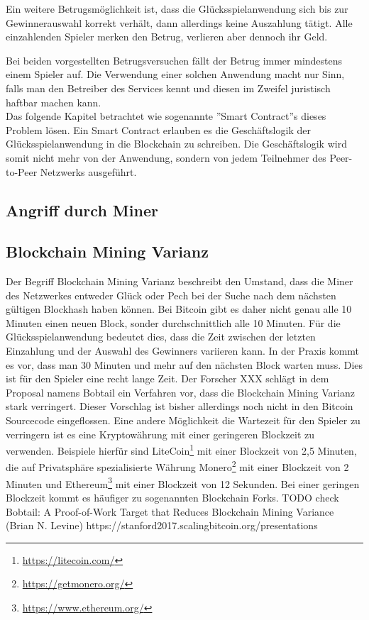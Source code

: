 Ein weitere Betrugsmöglichkeit ist, dass die Glücksspielanwendung sich bis zur Gewinnerauswahl korrekt verhält, dann allerdings keine Auszahlung tätigt. Alle einzahlenden Spieler merken den Betrug, verlieren aber dennoch ihr Geld.

Bei beiden vorgestellten Betrugsversuchen fällt der Betrug immer mindestens einem Spieler auf. Die Verwendung einer solchen Anwendung macht nur Sinn, falls man den Betreiber des Services kennt und diesen im Zweifel juristisch haftbar machen kann.\\
Das folgende Kapitel betrachtet wie sogenannte ''Smart Contract''s dieses Problem lösen. Ein Smart Contract erlauben es die Geschäftslogik der Glücksspielanwendung in die Blockchain zu schreiben. Die Geschäftslogik wird somit nicht mehr von der Anwendung, sondern von jedem Teilnehmer des Peer-to-Peer Netzwerks ausgeführt. 


\subsection{Angriff durch Miner}


\subsection{Blockchain Mining Varianz}
Der Begriff Blockchain Mining Varianz beschreibt den Umstand, dass die Miner des Netzwerkes entweder Glück oder Pech bei der Suche nach dem nächsten gültigen Blockhash haben können. Bei Bitcoin gibt es daher nicht genau alle 10 Minuten einen neuen Block, sonder durchschnittlich alle 10 Minuten. Für die Glücksspielanwendung bedeutet dies, dass die Zeit zwischen der letzten Einzahlung und der Auswahl des Gewinners variieren kann. In der Praxis kommt es vor, dass man 30 Minuten und mehr auf den nächsten Block warten muss. Dies ist für den Spieler eine recht lange Zeit. Der Forscher XXX schlägt in dem Proposal namens Bobtail ein Verfahren vor, dass die Blockchain Mining Varianz stark verringert. Dieser Vorschlag ist bisher allerdings noch nicht in den Bitcoin Sourcecode eingeflossen.
Eine andere Möglichkeit die Wartezeit für den Spieler zu verringern ist es eine  Kryptowährung mit einer geringeren Blockzeit zu verwenden. Beispiele hierfür sind LiteCoin\footnote{\url{https://litecoin.com/}} mit einer Blockzeit von 2,5 Minuten, die auf Privatsphäre spezialisierte Währung Monero\footnote{\url{https://getmonero.org/}} mit einer Blockzeit von 2 Minuten und Ethereum\footnote{\url{https://www.ethereum.org/}} mit einer Blockzeit von 12 Sekunden. Bei einer geringen Blockzeit kommt es häufiger zu sogenannten Blockchain Forks.
TODO check
Bobtail: A Proof-of-Work Target that Reduces Blockchain Mining Variance (Brian N. Levine)
https://stanford2017.scalingbitcoin.org/presentations

